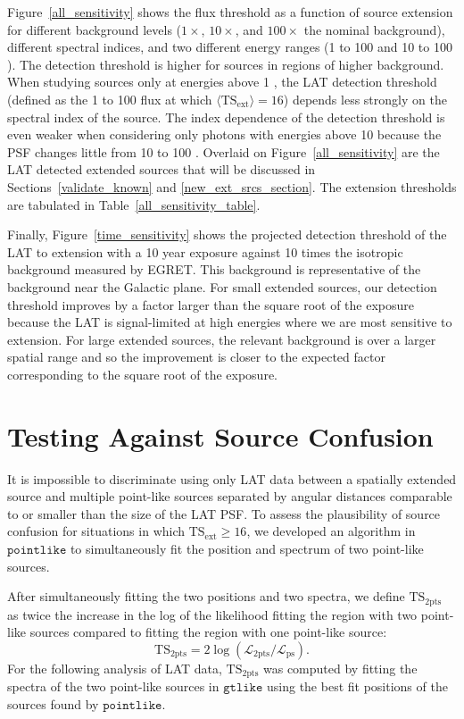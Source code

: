 \documentclass[12pt,preprint]{aastex}
\newcommand{\gev}{\text{GeV}\xspace}
\newcommand{\tsext}{{\ensuremath{\text{TS}_{\text{ext}}}}\xspace}
\newcommand{\tsinc}{\ensuremath{\text{TS}_{\text{2pts}}}\xspace}
\newcommand{\likelihood}{\ensuremath{\mathcal{L}}\xspace}
\newcommand{\gtlike}{\ensuremath{\mathtt{gtlike}}\xspace}
\newcommand{\pointlike}{\ensuremath{\mathtt{pointlike}}\xspace}
\begin{document}
Figure~\ref{all_sensitivity} shows the flux threshold as a function of
source extension for different background levels ($1\times$, $10\times$,
and $100\times$ the nominal background), different spectral indices,
and two different energy ranges (1 \gev to 100 \gev and 10 \gev to
100 \gev).  The detection threshold is higher for sources in regions of
higher background.  When studying sources only at energies above 1 \gev,
the LAT detection threshold (defined as the 1 \gev to 100 \gev flux at
which $\langle\tsext\rangle=16$) depends less strongly on the 
spectral index of the source. 
The index dependence of the detection threshold is
even weaker when considering only photons with energies above 10 \gev
because the PSF changes little from 10 \gev to 100 \gev.
Overlaid on Figure~\ref{all_sensitivity} are the LAT detected extended
sources that will be discussed in Sections~\ref{validate_known} and
\ref{new_ext_srcs_section}.  The extension thresholds are tabulated in
Table~\ref{all_sensitivity_table}.

Finally, Figure~\ref{time_sensitivity} shows the projected
detection threshold of the LAT to extension with a 10 year
exposure against 10 times
the isotropic background measured by EGRET. This background is
representative of the background near the Galactic plane.  For small
extended sources, our detection threshold improves by a factor larger
than the square root of the exposure because the LAT is signal-limited
at high energies where we are most sensitive to extension. For large
extended sources, the relevant background is over a larger spatial range
and so the improvement is closer to the expected factor corresponding
to the square root of the exposure.


\section{Testing Against Source Confusion}
\label{dual_localization_method}

It is impossible to discriminate using only LAT data between a
spatially extended source and multiple point-like sources separated by
angular distances comparable to or smaller than the size of the LAT PSF.
To assess the plausibility of source confusion for situations
in which $\tsext\ge16$, we developed an algorithm in \pointlike to
simultaneously fit the position and spectrum of two point-like sources.

After simultaneously fitting the two positions and two spectra,
we define \tsinc as twice the increase in the log of the likelihood
fitting the region with two point-like sources compared to fitting the
region with one point-like source:
\begin{equation}
  \tsinc=2\log(\likelihood_\text{2pts}/\likelihood_\text{ps}).
\end{equation} 
For the following analysis of LAT data, \tsinc was computed
by fitting the spectra of the two point-like sources in \gtlike using the best fit positions
of the sources found by \pointlike.
\end{document}
